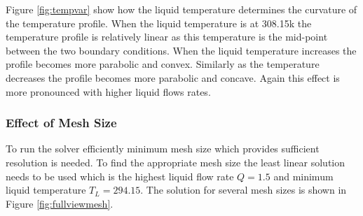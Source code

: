 \documentclass[11pt]{article}
\begin{document}
Figure \ref{fig:tempvar} show how the liquid temperature determines the curvature of the temperature profile. When the liquid temperature is at 308.15k the temperature profile is relatively linear as this temperature is the mid-point between the two boundary conditions. When the liquid temperature increases the profile becomes more parabolic and convex. Similarly as the temperature decreases the profile becomes more parabolic and concave. Again this effect is more pronounced with higher liquid flows rates.

\clearpage

\subsubsection{Effect of Mesh Size}

To run the solver efficiently minimum mesh size which provides sufficient resolution is needed. To find the appropriate mesh size the least linear solution needs to be used which is the highest liquid flow rate $Q = 1.5$ and minimum liquid temperature $T_L = 294.15$. The solution for several mesh sizes is shown in Figure \ref{fig:fullviewmesh}. 
\end{document}
